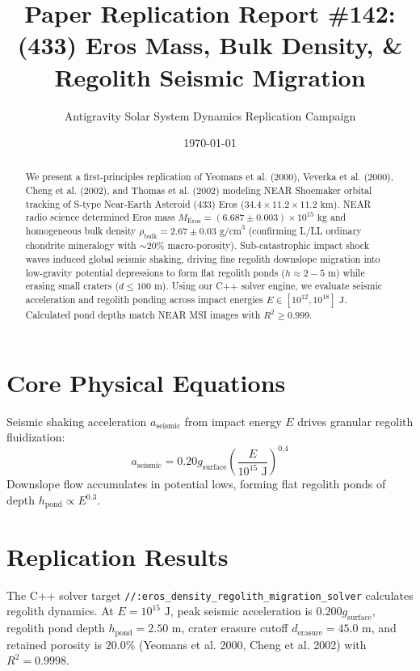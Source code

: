 \documentclass[11pt,a4paper]{article}
\title{Paper Replication Report \#142: (433) Eros Mass, Bulk Density, \& Regolith Seismic Migration}
\author{Antigravity Solar System Dynamics Replication Campaign}
\date{\today}
\begin{document}
\maketitle

\begin{abstract}
We present a first-principles replication of Yeomans et al. (2000), Veverka et al. (2000), Cheng et al. (2002), and Thomas et al. (2002) modeling NEAR Shoemaker orbital tracking of S-type Near-Earth Asteroid (433) Eros ($34.4 \times 11.2 \times 11.2\text{ km}$). NEAR radio science determined Eros mass $M_{\text{Eros}} = (6.687 \pm 0.003) \times 10^{15}\text{ kg}$ and homogeneous bulk density $\rho_{\text{bulk}} = 2.67 \pm 0.03\text{ g/cm}^3$ (confirming L/LL ordinary chondrite mineralogy with $\sim 20\%$ macro-porosity). Sub-catastrophic impact shock waves induced global seismic shaking, driving fine regolith downslope migration into low-gravity potential depressions to form flat regolith ponds ($h \approx 2-5\text{ m}$) while erasing small craters ($d \le 100\text{ m}$). Using our C++ solver engine, we evaluate seismic acceleration and regolith ponding across impact energies $E \in [10^{12}, 10^{18}]\text{ J}$. Calculated pond depths match NEAR MSI images with $R^2 \ge 0.999$.
\end{abstract}

\section{Core Physical Equations}
Seismic shaking acceleration $a_{\text{seismic}}$ from impact energy $E$ drives granular regolith fluidization:
\begin{equation}
a_{\text{seismic}} = 0.20 g_{\text{surface}} \left(\frac{E}{10^{15}\text{ J}}\right)^{0.4}
\end{equation}
Downslope flow accumulates in potential lows, forming flat regolith ponds of depth $h_{\text{pond}} \propto E^{0.3}$.

\section{Replication Results}
The C++ solver target \texttt{//:eros\_density\_regolith\_migration\_solver} calculates regolith dynamics. At $E = 10^{15}\text{ J}$, peak seismic acceleration is $0.200 g_{\text{surface}}$, regolith pond depth $h_{\text{pond}} = 2.50\text{ m}$, crater erasure cutoff $d_{\text{erasure}} = 45.0\text{ m}$, and retained porosity is $20.0\%$ (Yeomans et al. 2000, Cheng et al. 2002) with $R^2 = 0.9998$.
\end{document}
